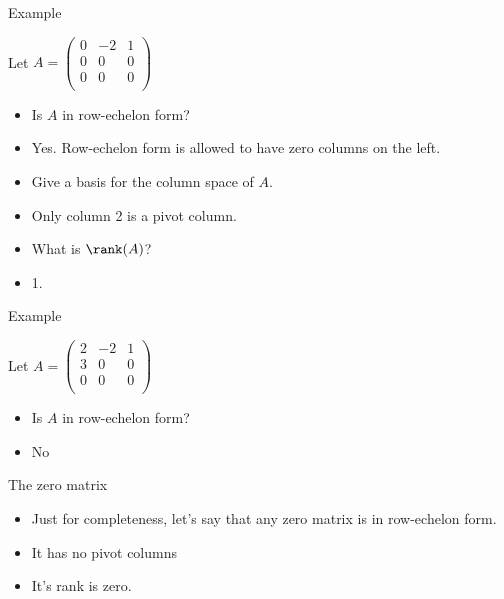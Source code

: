 \documentclass{beamer}
\begin{document}

\begin{frame}{Example}

Let
$
A=
\begin{pmatrix}
0 & -2  &   1 \\
0 &  0  &   0 \\
0 &  0  &   0 \\
\end{pmatrix}
$
\begin{itemize}
\item Is $A$ in row-echelon form?
\item Yes. Row-echelon form is allowed to have zero columns on the left.
\item Give a basis for the column space of $A$.
\item Only column 2 is a pivot column.
\item What is $\rank(A)$?
\item 1.
\end{itemize}

\end{frame}


\begin{frame}{Example}

Let
$
A=
\begin{pmatrix}
2 & -2  &   1 \\
3 &  0  &   0 \\
0 &  0  &   0 \\
\end{pmatrix}
$
\begin{itemize}
\item Is $A$ in row-echelon form?
\item No
\end{itemize}

\end{frame}


\begin{frame}{The zero matrix}


\begin{itemize}
\item Just for completeness, let's say that any zero matrix is in row-echelon form.
\item It has no pivot columns
\item It's rank is zero.
\end{itemize}

\end{frame}
\end{document}
